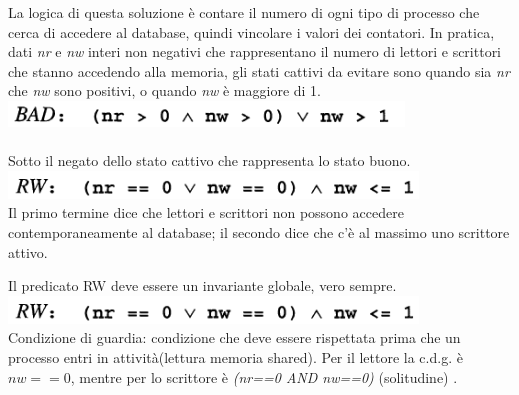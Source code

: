 \documentclass[10pt,a4paper]{article}
\begin{document}
La logica di questa soluzione è contare il numero di ogni tipo di processo che cerca di accedere al database, quindi vincolare i valori dei contatori. In pratica, dati \textit{nr} e \textit{nw} interi non negativi che rappresentano il numero di lettori e scrittori che stanno accedendo alla memoria, gli stati cattivi da evitare sono quando sia \textit{nr} che \textit{nw} sono positivi, o quando \textit{nw} è maggiore di 1.  \\
\includegraphics[scale=0.41]{img/baton.png} \\ \\
Sotto il negato dello stato cattivo che rappresenta lo stato buono. \\ 
\includegraphics[scale=0.41]{img/baton2.png} \\
Il primo termine dice che lettori e scrittori non possono accedere contemporaneamente al database; il secondo dice che c'è al massimo uno scrittore attivo.

Il predicato RW deve essere un invariante globale, vero sempre.\\

\includegraphics[scale=0.41]{img/baton2.png} \\
Condizione di guardia: condizione che deve essere rispettata prima che un processo entri in attività(lettura memoria shared).
Per il lettore la c.d.g. è $ nw == 0 $, mentre per lo scrittore è \textit{(nr==0 AND nw==0)} (solitudine) .
\end{document}
